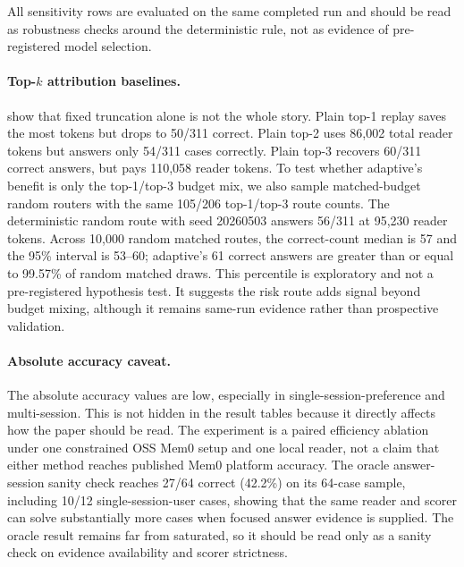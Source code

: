 \documentclass{article}
\begin{document}
All sensitivity rows are evaluated on the same completed run and should be read as robustness checks around the deterministic rule, not as evidence of pre-registered model selection.

\paragraph{Top-$k$ attribution baselines.}
 show that fixed truncation alone is not the whole story. Plain top-1 replay saves the most tokens but drops to 50/311 correct. Plain top-2 uses 86{,}002 total reader tokens but answers only 54/311 cases correctly. Plain top-3 recovers 60/311 correct answers, but pays 110{,}058 reader tokens. To test whether adaptive's benefit is only the top-1/top-3 budget mix, we also sample matched-budget random routers with the same 105/206 top-1/top-3 route counts. The deterministic random route with seed 20260503 answers 56/311 at 95{,}230 reader tokens. Across 10{,}000 random matched routes, the correct-count median is 57 and the 95\% interval is 53--60; adaptive's 61 correct answers are greater than or equal to 99.57\% of random matched draws. This percentile is exploratory and not a pre-registered hypothesis test. It suggests the risk route adds signal beyond budget mixing, although it remains same-run evidence rather than prospective validation.

\paragraph{Absolute accuracy caveat.}
The absolute accuracy values are low, especially in single-session-preference and multi-session. This is not hidden in the result tables because it directly affects how the paper should be read. The experiment is a paired efficiency ablation under one constrained OSS Mem0 setup and one local reader, not a claim that either method reaches published Mem0 platform accuracy. The oracle answer-session sanity check reaches 27/64 correct (42.2\%) on its 64-case sample, including 10/12 single-session-user cases, showing that the same reader and scorer can solve substantially more cases when focused answer evidence is supplied. The oracle result remains far from saturated, so it should be read only as a sanity check on evidence availability and scorer strictness.
\end{document}
